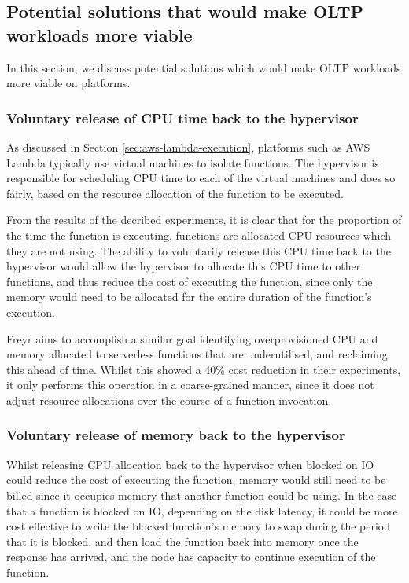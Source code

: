 \subsection{Potential solutions that would make OLTP workloads more viable}
In this section, we discuss potential solutions which would make OLTP workloads more viable on \faas{} platforms.

\subsubsection{Voluntary release of CPU time back to the hypervisor}
As discussed in Section \ref{sec:aws-lambda-execution}, \faas{} platforms such as AWS Lambda typically use virtual machines to isolate functions. The hypervisor is responsible for scheduling CPU time to each of the virtual machines and does so fairly, based on the resource allocation of the function to be executed.

From the results of the decribed experiments, it is clear that for the proportion of the time the function is executing, functions are allocated CPU resources which they are not using. The ability to voluntarily release this CPU time back to the hypervisor would allow the hypervisor to allocate this CPU time to other functions, and thus reduce the cost of executing the function, since only the memory would need to be allocated for the entire duration of the function's execution.

Freyr aims to accomplish a similar goal identifying overprovisioned CPU and memory allocated to serverless functions \cite{yuAcceleratingServerlessComputing2022} that are underutilised, and reclaiming this ahead of time. Whilst this showed a 40\% cost reduction in their experiments, it only performs this operation in a coarse-grained manner, since it does not adjust resource allocations over the course of a function invocation.

\subsubsection{Voluntary release of memory back to the hypervisor}
Whilst releasing CPU allocation back to the hypervisor when blocked on IO could reduce the cost of executing the function, memory would still need to be billed since it occupies memory that another function could be using. In the case that a function is blocked on IO, depending on the disk latency, it could be more cost effective to write the blocked function's memory to swap during the period that it is blocked, and then load the function back into memory once the response has arrived, and the node has capacity to continue execution of the function.

